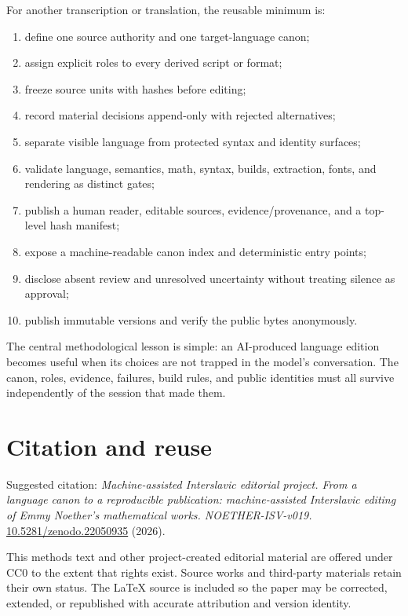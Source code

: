 \documentclass[11pt]{article}
\newcommand{\doiurl}[1]{\href{https://doi.org/#1}{#1}}
\begin{document}
For another transcription or translation, the reusable minimum is:

\begin{enumerate}
\item define one source authority and one target-language canon;
\item assign explicit roles to every derived script or format;
\item freeze source units with hashes before editing;
\item record material decisions append-only with rejected alternatives;
\item separate visible language from protected syntax and identity surfaces;
\item validate language, semantics, math, syntax, builds, extraction, fonts, and rendering as distinct gates;
\item publish a human reader, editable sources, evidence/provenance, and a top-level hash manifest;
\item expose a machine-readable canon index and deterministic entry points;
\item disclose absent review and unresolved uncertainty without treating silence as approval;
\item publish immutable versions and verify the public bytes anonymously.
\end{enumerate}

The central methodological lesson is simple: an AI-produced language edition becomes useful when its choices are not trapped in the model's conversation. The canon, roles, evidence, failures, build rules, and public identities must all survive independently of the session that made them.

\section*{Citation and reuse}

Suggested citation: \emph{Machine-assisted Interslavic editorial project. From a language canon to a reproducible publication: machine-assisted Interslavic editing of Emmy Noether's mathematical works. NOETHER-ISV-v019.} \doiurl{10.5281/zenodo.22050935} (2026).

This methods text and other project-created editorial material are offered under CC0 to the extent that rights exist. Source works and third-party materials retain their own status. The LaTeX source is included so the paper may be corrected, extended, or republished with accurate attribution and version identity.
\end{document}
